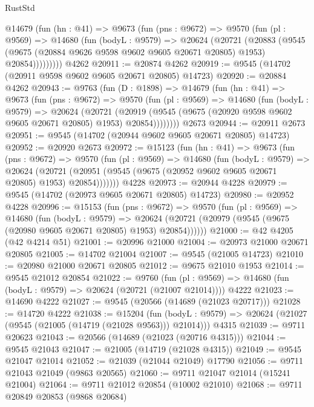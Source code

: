 \begin{lexlean}{RustStd}
\begin{coremodule}
      @14679
        (fun (hn : @41) =>
        @9673
          (fun (pns : @9672) =>
          @9570
            (fun (pl : @9569) =>
            @14680
              (fun (bodyL : @9579) =>
              @20624
                (@20721
                  (@20883
                    (@9545
                      (@9675 (@20884 @9626 @9598 @9602 @9605 @20671 @20805) @1953)
                      @20854)))))))))
    @4262
@20911 := @20874 @4262
@20919 := @9545 (@14702 (@20911 @9598 @9602 @9605 @20671 @20805) @14723)
@20920 := @20884 @4262
@20943 := @9763
    (fun (D : @1898) =>
    @14679
      (fun (hn : @41) =>
      @9673
        (fun (pns : @9672) =>
        @9570
          (fun (pl : @9569) =>
          @14680
            (fun (bodyL : @9579) =>
            @20624
              (@20721
                (@20919 (@9545 (@9675 (@20920 @9598 @9602 @9605 @20671 @20805) @1953) @20854))))))))
    @2673
@20944 := @20911 @2673
@20951 := @9545 (@14702 (@20944 @9602 @9605 @20671 @20805) @14723)
@20952 := @20920 @2673
@20972 := @15123
    (fun (hn : @41) =>
    @9673
      (fun (pns : @9672) =>
      @9570
        (fun (pl : @9569) =>
        @14680
          (fun (bodyL : @9579) =>
          @20624
            (@20721 (@20951 (@9545 (@9675 (@20952 @9602 @9605 @20671 @20805) @1953) @20854)))))))
    @4228
@20973 := @20944 @4228
@20979 := @9545 (@14702 (@20973 @9605 @20671 @20805) @14723)
@20980 := @20952 @4228
@20996 := @15153
    (fun (pns : @9672) =>
    @9570
      (fun (pl : @9569) =>
      @14680
        (fun (bodyL : @9579) =>
        @20624 (@20721 (@20979 (@9545 (@9675 (@20980 @9605 @20671 @20805) @1953) @20854))))))
@21000 := @42 @4205 (@42 @4214 @51)
@21001 := @20996 @21000
@21004 := @20973 @21000 @20671 @20805
@21005 := @14702 @21004
@21007 := @9545 (@21005 @14723)
@21010 := @20980 @21000 @20671 @20805
@21012 := @9675 @21010 @1953
@21014 := @9545 @21012 @20854
@21022 := @9760
    (fun (pl : @9569) => @14680 (fun (bodyL : @9579) => @20624 (@20721 (@21007 @21014))))
    @4222
@21023 := @14690 @4222
@21027 := @9545 (@20566 (@14689 (@21023 @20717)))
@21028 := @14720 @4222
@21038 := @15204
    (fun (bodyL : @9579) => @20624 (@21027 (@9545 (@21005 (@14719 (@21028 @9563))) @21014)))
    @4315
@21039 := @9711 @20623
@21043 := @20566 (@14689 (@21023 (@20716 @4315)))
@21044 := @9545 @21043
@21047 := @21005 (@14719 (@21028 @4315))
@21049 := @9545 @21047 @21014
@21052 := @21039 (@21044 @21049) @17790
@21056 := @9711 @21043 @21049 (@9863 @20565)
@21060 := @9711 @21047 @21014 (@15241 @21004)
@21064 := @9711 @21012 @20854 (@10002 @21010)
@21068 := @9711 @20849 @20853 (@9868 @20684)

\end{coremodule}
\end{lexlean}
